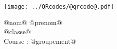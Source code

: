 \Huge

\begin{block} %
{}\hfill {}



\vspace{1cm}


\begin{minipage}{0.3\linewidth}
\texttt{[image: ../QRcodes/@qrcode@.pdf]}
\end{minipage}
{}\hfill {}
\begin{minipage}{0.33\linewidth}
{}\hfill {}
{}\hfill {}


\begin{center}
	@nom@ @prenom@\\
	@classe@ \\
	Course : @groupement@
\end{center}

	


\end{minipage}
\end{block}
